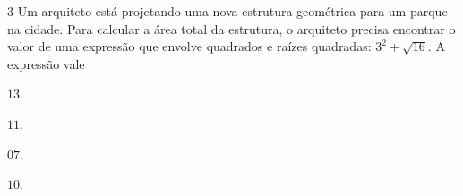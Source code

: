 

\num{3} Um arquiteto está projetando uma nova estrutura geométrica para um
parque na cidade. Para calcular a área total da estrutura, o arquiteto precisa
encontrar o valor de uma expressão que envolve quadrados e raízes quadradas:
$3^2 + \sqrt{16}$. A expressão vale

\begin{multicols}{2}
\begin{escolha}
\item $13$.

\item $11$.

\item $07$.

\item $10$.
\end{escolha}
\end{multicols}



